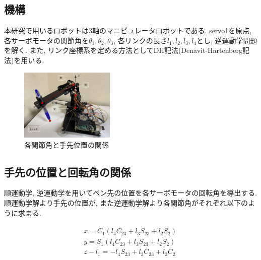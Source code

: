 \documentclass[10pt]{jarticle}
\begin{document}
	\subsection{機構}
	本研究で用いるロボットは3軸のマニピュレータロボットである.
	servo1を原点, 各サーボモータの関節角を$\theta_1, \theta_2, \theta_3$, 各リンクの長さ$l_1, l_2, l_3, l_4$とし, 逆運動学問題を解く.
	また, リンク座標系を定める方法としてDH記法(Denavit-Hartenberg記法)を用いる.

    \begin{center}
        \begin{figure}[h]
            \includegraphics[width=0.40\textwidth]{img/002.png}
            \caption{各関節角と手先位置の関係}
            \label{manipulator}
        \end{figure}
    \end{center}
    
	\subsection{手先の位置と回転角の関係}
	順運動学, 逆運動学を用いてペン先の位置を各サーボモータの回転角を導出する.
	順運動学解より手先の位置が, また逆運動学解より各関節角がそれぞれ以下のように求まる.
	
	\scriptsize
	\begin{equation}
		\begin{array}{c}
			\begin{split}
				&  x  =  C_1(l_4C_{23}  +  l_3S_{23}  +  l_2S_2)\quad \\
				&  y  =  S_1(l_4C_{23}  +  l_3S_{23}  +  l_2S_2)\quad \\
				&  z  -  l_1  =  -l_4S_{23}  +  l_3C_{23}  +  l_2C_2\quad \\
			\end{split}
		\end{array}
	\end{equation}
\end{document}

